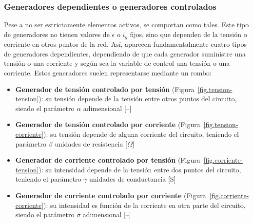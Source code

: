 \documentclass[11pt]{book} %
\begin{document}
	\subsubsection{Generadores dependientes o generadores controlados}
	Pese a no ser estrictamente elementos activos, se comportan como tales. Este tipo de generadores no tienen valores de $\epsilon$ o $i_g$ fijos, sino que dependen de la tensión o corriente en otros puntos de la red. Así, aparecen fundamentalmente cuatro tipos de generadores dependientes, dependiendo de que cada generador suministre una tensión o una corriente y según sea la variable de control una tensión o una corriente. Estos generadores suelen representarse mediante un rombo:
	\begin{itemize}
		\item \textbf{Generador de tensión controlado por tensión} (Figura~\ref{fig.tension-tension}): su tensión depende de la tensión entre otros puntos del circuito, siendo el parámetro $\alpha$ adimensional [--]
		\item \textbf{Generador de tensión controlado por corriente} (Figura~\ref{fig.tension-corriente}): su tensión depende de alguna corriente del circuito, teniendo el parámetro $\beta$ unidades de resistencia [$\Omega$]
		\item \textbf{Generador de corriente controlado por tensión} (Figura~\ref{fig.corriente-tension}): su intensidad depende de la tensión entre dos puntos del circuito, teniendo el parámetro $\gamma$ unidades de conductancia [S]
		\item \textbf{Generador de corriente controlado por corriente} (Figura~\ref{fig.corriente-corriente}): su intensidad es función de la corriente en otra parte del circuito, siendo el parámetro $\sigma$ adimensional [--]
	\end{itemize}
\end{document}
